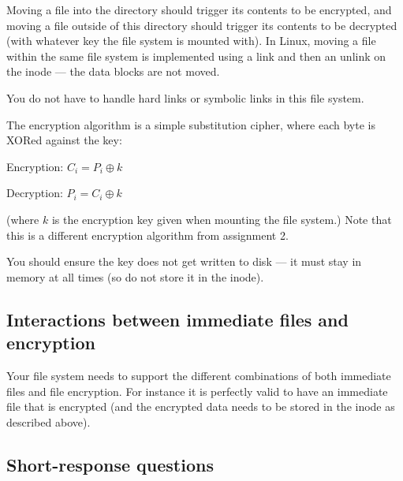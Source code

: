 \documentclass[12pt,a4paper]{article}
\begin{document}
Moving a file into the  directory should trigger its contents to
be encrypted, and moving a file outside of this directory should trigger its
contents to be decrypted (with whatever key the file system is mounted with).
In Linux, moving a file within the same file system is implemented using a
link and then an unlink on the inode --- the data blocks are not moved. 

You do not have to handle hard links or symbolic links in this file system.

The encryption algorithm is a simple substitution cipher, where each byte is
XORed against the key:

Encryption: $C_i = P_i \oplus k$

Decryption: $P_i = C_i \oplus k$

(where $k$ is the encryption key given when mounting the file system.) Note that
this is a different encryption algorithm from assignment 2.

You should ensure the key does not get written to disk --- it must stay in memory
at all times (so do not store it in the inode).

\subsection*{Interactions between immediate files and encryption}

Your file system needs to support the different combinations of both immediate
files and file encryption. For instance it is perfectly valid to have an
immediate file that is encrypted (and the encrypted data needs to be stored in
the inode as described above).

\subsection*{Short-response questions}
\end{document}
